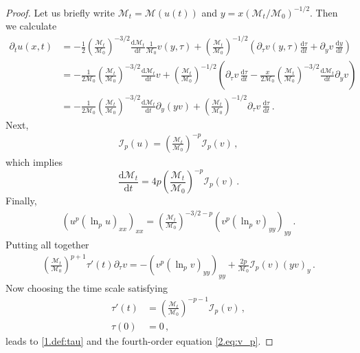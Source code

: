 \documentclass[10pt,a4paper]{amsart}
\let\pa\partial
\newcommand{\I}{\mathcal{I}}
\newcommand{\M}{\mathcal{M}}
\newcommand{\dd}{{\mathrm{d}}}
\begin{document}
\begin{proof}
Let us briefly write $\M_t = \M(u(t))$ and $y = x (\M_t/\M_0)^{-1/2}$. Then we calculate
    \begin{align*}
        \pa_t u(x,t) &= -\frac12\left(\frac{\M_t}{\M_0}\right)^{-3/2}\frac{\dd \M_t}{\dd t}\frac{1}{\M_0}v(y,\tau) + \left(\frac{\M_t}{\M_0}\right)^{-1/2}\left(\pa_\tau v(y,\tau) \frac{\dd \tau}{\dd t} + \pa_yv\,\frac{\dd y}{\dd t}\right)\\
        &= -\frac{1}{2\M_0}\left(\frac{\M_t}{\M_0}\right)^{-3/2}\frac{\dd \M_t}{\dd t}v + \left(\frac{\M_t}{\M_0}\right)^{-1/2}\left(\pa_\tau v\, \frac{\dd \tau}{\dd t} - \frac{x}{2\M_0} \left(\frac{\M_t}{\M_0}\right)^{-3/2}\frac{\dd \M_t}{\dd t}\pa_y v\right)\\
        &= -\frac{1}{2\M_0} \left(\frac{\M_t}{\M_0}\right)^{-3/2}\frac{\dd \M_t}{\dd t}\pa_y(y v) + \left(\frac{\M_t}{\M_0}\right)^{-1/2}\pa_\tau v\, \frac{\dd \tau}{\dd t}\,.
    \end{align*}
    Next,
    \begin{align*}
        \I_p(u) = \left(\frac{\M_t}{\M_0}\right)^{-p}\I_p(v)\,,
    \end{align*}
    which implies
    \begin{equation*}
        \frac{\dd \M_t}{\dd t} = 4p \left(\frac{\M_t}{\M_0}\right)^{-p}\I_p(v)\,.
    \end{equation*}
    Finally,
    \begin{align*}
        \left(u^p\left(\ln_{p}u\right)_{xx}\right)_{xx} = \left(\frac{\M_t}{\M_0}\right)^{-3/2 -p}\left(v^p\left(\ln_{p}v\right)_{yy}\right)_{yy}\,.
    \end{align*}
    Putting all together
    \begin{align*}
        \left(\frac{\M_t}{\M_0}\right)^{p + 1}\tau'(t)\pa_\tau v = - \left(v^p\left(\ln_{p}v\right)_{yy}\right)_{yy} + \frac{2p}{\M_0}\I_p(v)(y v)_y\,.
    \end{align*}
    Now choosing the time scale satisfying
    \begin{align*}
        \tau'(t) &= \left(\frac{\M_t}{\M_0}\right)^{-p - 1}\I_p(v)\,,\\
        \tau(0) &= 0\,,
    \end{align*}
    leads to \eqref{1.def:tau} and the fourth-order equation \eqref{2.eq:v_p}.
\end{proof}
\end{document}
